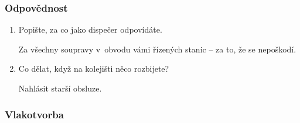 \documentclass[12pt,a4paper]{article}
\def\solution#1{\ifsolution \par{\color{gray}#1}\fi}
\begin{document}
\subsubsection*{Odpovědnost}
\begin{enumerate}[leftmargin=*]
\item Popište, za co jako dispečer odpovídáte.
\solution{Za všechny soupravy v~obvodu vámi řízených stanic – za to, že se
nepoškodí.}

\item Co dělat, když na kolejišti něco rozbijete?
\solution{Nahlásit starší obsluze.}

\end{enumerate}

\subsubsection*{Vlakotvorba}
\end{document}
